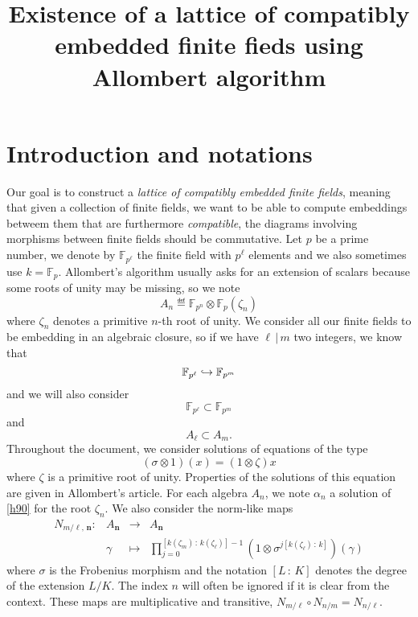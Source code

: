 \documentclass[a4paper,11pt]{article}
\title{Existence of a lattice of compatibly embedded finite fieds using
Allombert algorithm}
\author{}
\begin{document}
\maketitle





\section{Introduction and notations}
\label{sec:intro}

Our goal is to construct a \emph{lattice of compatibly embedded finite fields},
meaning that given a collection of finite fields, we want to be able to compute
embeddings betweem them that are furthermore \emph{compatible}, \ie the diagrams
involving morphisms between finite fields should be commutative. Let $p$ be a
prime number, we denote by $\mathbb{F}_{p^{\ell}}$ the finite field with
$p^\ell$ elements and we also sometimes use $k=\mathbb{F}_p$. Allombert's algorithm usually asks for an extension of
scalars because some roots of unity may be missing, so we note 
\[
  A_n \eqdef \mathbb{F}_{p^n}\otimes\mathbb{F}_{p}(\zeta_n)
\]
where $\zeta_n$ denotes a primitive $n$-th root of unity. We consider all our finite
fields to be embedding in an algebraic closure, so if we have $\ell\,|\,m$ two
integers, we know that
\[
  \mathbb{F}_{p^{\ell}}\hookrightarrow\mathbb{F}_{p^m}
\]
and we will also consider 
\[
  \mathbb{F}_{p^{\ell}}\subset\mathbb{F}_{p^m}
\]
and
\[
  A_{\ell}\subset A_m.
\]
Throughout the document, we consider solutions of equations of the type
\begin{equation}
  \tag{H90}
 (\sigma\otimes1)(x) = (1\otimes\zeta)x
  \label{h90}
\end{equation}
where $\zeta$ is a primitive root of unity. Properties of the solutions of this
equation are given in Allombert's article. For each algebra $A_n$, we note
$\alpha_n$ a solution of \eqref{h90} for the root $\zeta_n$. We also consider
the norm-like maps
\[
\begin{array}{cccc}
  N_{m/\ell,\, \bm{n}}: & A_{\bm{n}} & \to &
  A_{\bm{n}} \\
  & \gamma & \mapsto & \prod_{j=0}^{\left[ k(\zeta_m)\,:\,k(\zeta_\ell) \right]-1} (1 \otimes
  \sigma^{j\left[ k(\zeta_\ell)\,:\,k \right]})(\gamma)
\end{array}
\]
where $\sigma$ is the Frobenius morphism and the notation $\left[ L\,:\,K
\right]$ denotes the degree of the extension $L/K$. The index $n$ will often be
ignored if it is clear from the context. These maps are multiplicative and
transitive, \ie $N_{m/\ell}\circ N_{n/m} = N_{n/\ell}$.
\end{document}
